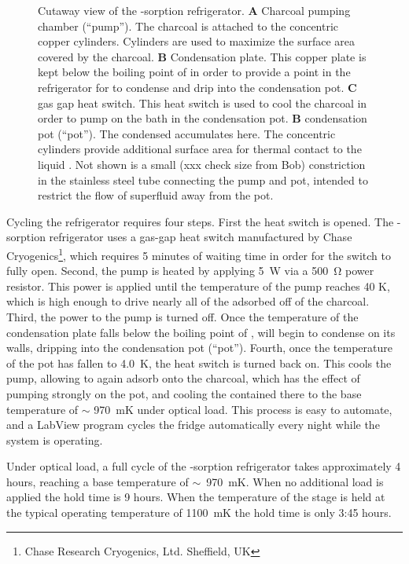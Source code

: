 \begin{figure}[th]
\caption{Cutaway view of the -sorption refrigerator. \textbf{A} Charcoal pumping chamber (``pump''). The charcoal is attached to the concentric copper cylinders. Cylinders are used to maximize the surface area covered by the charcoal. \textbf{B} Condensation plate. This copper plate is kept below the boiling point of  in order to provide a point in the refrigerator for  to condense and drip into the condensation pot. \textbf{C}  gas gap heat switch. This heat switch is used to cool the charcoal in order to pump on the  bath in the condensation pot. \textbf{B}  condensation pot (``pot''). The condensed  accumulates here. The concentric cylinders provide additional surface area for thermal contact to the liquid . Not shown is a small (xxx check size from Bob) constriction in the stainless steel tube connecting the pump and pot, intended to restrict the flow of superfluid  away from the pot.}
\label{fig:he4sorp}
\end{figure}

Cycling the refrigerator requires four steps.
First the heat switch is opened.
The -sorption refrigerator uses a  gas-gap heat switch manufactured by Chase Cryogenics\footnote{Chase Research Cryogenics, Ltd. Sheffield, UK}, which requires 5 minutes of waiting time in order for the switch to fully open.
Second, the pump is heated by applying \SI{5}{\W} via a \SI{500}{\ohm} power resistor.
This power is applied until the temperature of the pump reaches 40 K, which is high enough to drive nearly all of the adsorbed  off of the charcoal.
Third, the power to the pump is turned off.
Once the temperature of the condensation plate falls below the boiling point of ,  will begin to condense on its walls, dripping into the  condensation pot (``pot'').
Fourth, once the temperature of the pot has fallen to 4.0~K, the heat switch is turned back on.
This cools the pump, allowing  to again adsorb onto the charcoal, which has the effect of pumping strongly on the pot, and cooling the  contained there to the base temperature of $\sim$ 970~mK under optical load.
This process is easy to automate, and a LabView program cycles the fridge automatically every night while the system is operating.

Under optical load, a full cycle of the -sorption refrigerator takes approximately 4 hours, reaching a base temperature of $\sim$~970~mK.
When no additional load is applied the hold time is 9 hours.
When the temperature of the stage is held at the typical operating temperature of 1100~mK the hold time is only 3:45 hours.

